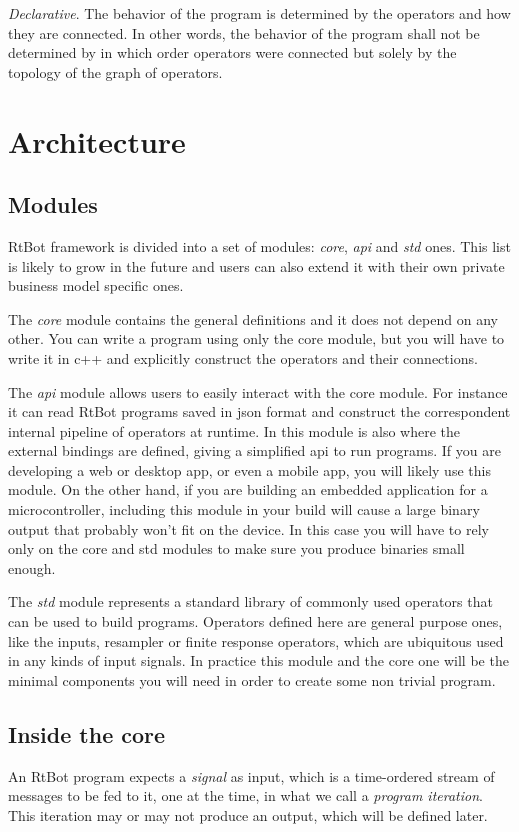 \documentclass[preprint,1p,times]{elsarticle}
\begin{document}
\textit{Declarative}. The behavior of the program is determined by the operators and how they are connected. In other words, 
the behavior of the program shall not be determined by in which order operators were connected but solely by the topology
 of the graph of operators.

\section{Architecture}
\subsection{Modules}
RtBot framework is divided into a set of modules: \textit{core}, \textit{api} and \textit{std} ones. This 
list is likely to grow in the future and users can also extend it with their own 
private business model specific ones.


The \textit{core} module contains the general definitions and it does not depend on any 
other. You can write a program using only the core module, but you will have to 
write it in c++ and explicitly construct the operators and their connections. 


The \textit{api} module allows users to easily interact with the core module. For instance 
it can read RtBot programs saved in json format and construct the correspondent 
internal pipeline of operators at runtime. In this module is also where the 
external bindings are defined, giving a simplified api to run programs. If you are 
developing a web or desktop app, or even a mobile app, you will likely use this 
module. On the other hand, if you are building an embedded application for a 
microcontroller, including this module in your build will cause a large binary 
output that probably won’t fit on the device. In this case you will have to rely 
only on the core and std modules to make sure you produce binaries small enough.


The \textit{std} module represents a standard library of commonly used operators that can 
be used to build programs. Operators defined here are general purpose ones, like 
the inputs, resampler or finite response operators, which are ubiquitous used in 
any kinds of input signals. In practice this module and the core one will be the 
minimal components you will need in order to create some non trivial program.

\subsection{Inside the core}
An RtBot program expects a \textit{signal} as input, which is a time-ordered stream of 
messages to be fed to it, one at the time, in what we call a \textit{program iteration}. 
This iteration may or may not produce an output, which will be defined later.
\end{document}
